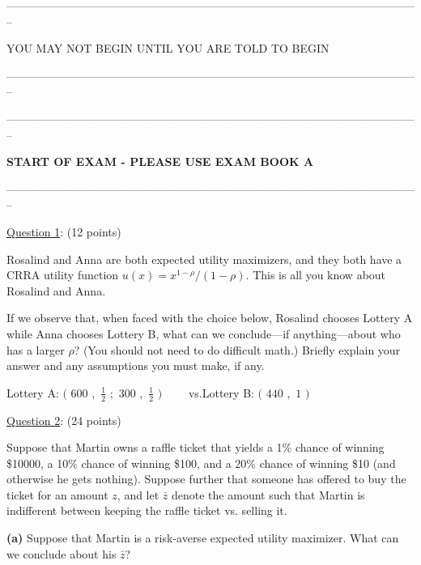 \documentclass[12pt]{article}
\theoremstyle{definition}
\begin{document}
\begin{center}
--------------------------------------------------------------------------------------------------------------

YOU MAY NOT BEGIN UNTIL YOU ARE TOLD TO BEGIN

--------------------------------------------------------------------------------------------------------------
\end{center}

\pagebreak
\doublespacing
\begin{center}
--------------------------------------------------------------------------------------------------------------

\textbf{START OF EXAM - PLEASE USE EXAM BOOK A} 

--------------------------------------------------------------------------------------------------------------
\end{center}

\bigskip

\underline{Question 1}: (12 points)

Rosalind and Anna are both expected utility maximizers, and they both have a
CRRA utility function $u(x)=x^{1-\rho }/(1-\rho )$. This is all you know about Rosalind and Anna.

If we observe that, when faced with the choice below, Rosalind chooses
Lottery A while Anna chooses Lottery B, what can we conclude---if anything---about who has a
larger $\rho $? (You should not need to do difficult math.) Briefly explain your answer and any assumptions you must make, if any. 

\begin{center}
Lottery A: $($ $600$ $,$ $\frac{1}{2}$ $;$ $300$ $,$ $\frac{1}{2}$ $)\qquad $%
vs.\qquad Lottery B: $($ $440$ $,$ $1$ $)$
\end{center}

\bigskip

\underline{Question 2}: (24 points)

Suppose that Martin owns a raffle ticket that yields a 1\% chance of
winning \$10000, a 10\% chance of winning \$100, and a 20\% chance of winning
\$10 (and otherwise he gets nothing). Suppose further that someone has
offered to buy the ticket for an amount $z$, and let $\bar{z}$ denote the
amount such that Martin is indifferent between keeping the raffle ticket
vs. selling it.

\textbf{(a)} Suppose that Martin is a risk-averse expected utility
maximizer. What can we conclude about his $\bar{z}$? 
\end{document}
